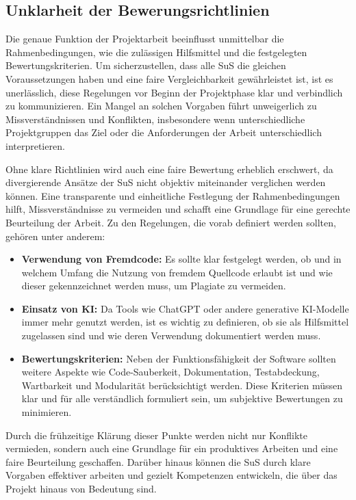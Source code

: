 \documentclass[a4paper,12pt]{article}
\begin{document}
\subsection{Unklarheit der Bewerungsrichtlinien}
Die genaue Funktion der Projektarbeit beeinflusst unmittelbar die Rahmenbedingungen, wie die zulässigen Hilfsmittel und die festgelegten Bewertungskriterien. Um sicherzustellen, dass alle SuS die gleichen Voraussetzungen haben und eine faire Vergleichbarkeit gewährleistet ist, ist es unerlässlich, diese Regelungen vor Beginn der Projektphase klar und verbindlich zu kommunizieren. Ein Mangel an solchen Vorgaben führt unweigerlich zu Missverständnissen und Konflikten, insbesondere wenn unterschiedliche Projektgruppen das Ziel oder die Anforderungen der Arbeit unterschiedlich interpretieren.

Ohne klare Richtlinien wird auch eine faire Bewertung erheblich erschwert, da divergierende Ansätze der SuS nicht objektiv miteinander verglichen werden können. Eine transparente und einheitliche Festlegung der Rahmenbedingungen hilft, Missverständnisse zu vermeiden und schafft eine Grundlage für eine gerechte Beurteilung der Arbeit.
Zu den Regelungen, die vorab definiert werden sollten, gehören unter anderem:

\begin{itemize}
    \item \textbf{Verwendung von Fremdcode:} Es sollte klar festgelegt werden, ob und in welchem Umfang die Nutzung von fremdem Quellcode erlaubt ist und wie dieser gekennzeichnet werden muss, um Plagiate zu vermeiden.
    \item \textbf{Einsatz von KI:} Da Tools wie ChatGPT oder andere generative KI-Modelle immer mehr genutzt werden, ist es wichtig zu definieren, ob sie als Hilfsmittel zugelassen sind und wie deren Verwendung dokumentiert werden muss.
    \item \textbf{Bewertungskriterien:} Neben der Funktionsfähigkeit der Software sollten weitere Aspekte wie Code-Sauberkeit, Dokumentation, Testabdeckung, Wartbarkeit und Modularität berücksichtigt werden. Diese Kriterien müssen klar und für alle verständlich formuliert sein, um subjektive Bewertungen zu minimieren.
\end{itemize}

Durch die frühzeitige Klärung dieser Punkte werden nicht nur Konflikte vermieden, sondern auch eine Grundlage für ein produktives Arbeiten und eine faire Beurteilung geschaffen. Darüber hinaus können die SuS durch klare Vorgaben effektiver arbeiten und gezielt Kompetenzen entwickeln, die über das Projekt hinaus von Bedeutung sind.
\end{document}
